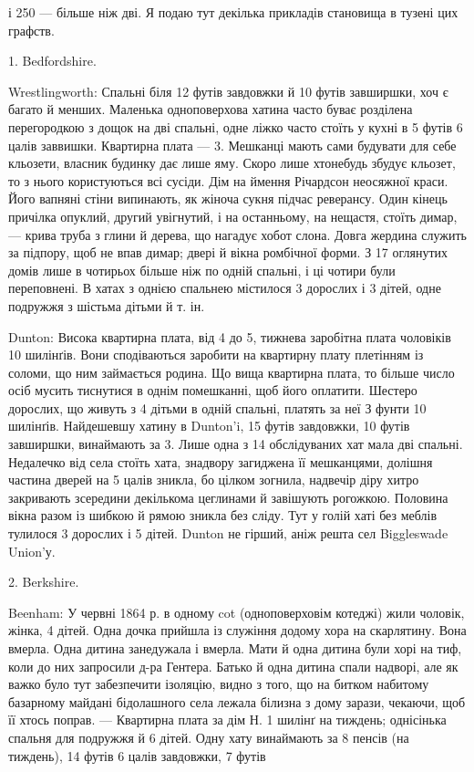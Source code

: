 \parcont{}  %
і 250 — більше ніж дві. Я подаю тут декілька прикладів становища
в тузені цих графств.

1. Bedfordshire.

Wrestlingworth: Спальні біля 12 футів завдовжки й 10 футів
завширшки, хоч є багато й менших. Маленька одноповерхова
хатина часто буває розділена перегородкою з дощок на дві
спальні, одне ліжко часто стоїть у кухні в 5 футів 6 цалів заввишки.
Квартирна плата — 3. Мешканці мають
сами будувати для себе кльозети, власник будинку дає лише
яму. Скоро лише хтонебудь збудує кльозет, то з нього користуються
всі сусіди. Дім на ймення Річардсон неосяжної краси.
Його вапняні стіни випинають, як жіноча сукня підчас реверансу.
Один кінець причілка опуклий, другий увігнутий, і на
останньому, на нещастя, стоїть димар, — крива труба з глини
й дерева, що нагадує хобот слона. Довга жердина служить за
підпору, щоб не впав димар; двері й вікна ромбічної форми.
З 17 оглянутих домів лише в чотирьох більше ніж по одній
спальні, і ці чотири були переповнені. В хатах з однією спальнею
містилося 3 дорослих і 3 дітей, одне подружжя з шістьма
дітьми й т. ін.

Dunton: Висока квартирна плата, від 4 до 5,
тижнева заробітна плата чоловіків 10 шилінґів. Вони сподіваються
заробити на квартирну плату плетінням із соломи, що ним займається
родина. Що вища квартирна плата, то більше число осіб
мусить тиснутися в однім помешканні, щоб його оплатити. Шестеро
дорослих, що живуть з 4 дітьми в одній спальні, платять за неї
З фунти 10 шилінґів. Найдешевшу хатину в Dunton’i, 15 футів
завдовжки, 10 футів завширшки, винаймають за 3.
Лише одна з 14 обслідуваних хат мала дві спальні. Недалечко
від села стоїть хата, знадвору загиджена її мешканцями, долішня
частина дверей на 5 цалів зникла, бо цілком зогнила, надвечір
діру хитро закривають зсередини декількома цеглинами й завішують
рогожкою. Половина вікна разом із шибкою й рямою
зникла без сліду. Тут у голій хаті без меблів тулилося 3 дорослих
і 5 дітей. Dunton не гірший, аніж решта сел Biggleswade Union’у.

2. Berkshire.

Beenham: У червні 1864 р. в одному cot (одноповерховім
котеджі) жили чоловік, жінка, 4 дітей. Одна дочка прийшла із
служіння додому хора на скарлятину. Вона вмерла. Одна дитина
занедужала і вмерла. Мати й одна дитина були хорі на тиф, коли
до них запросили д-ра Гентера. Батько й одна дитина спали
надворі, але як важко було тут забезпечити ізоляцію, видно з
того, що на битком набитому базарному майдані бідолашного
села лежала білизна з дому зарази, чекаючи, щоб її хтось поправ.
— Квартирна плата за дім Н. 1 шилінґ на тиждень; однісінька
спальня для подружжя й 6 дітей. Одну хату винаймають
за 8 пенсів (на тиждень), 14 футів 6 цалів завдовжки, 7 футів
\parbreak{}  %
